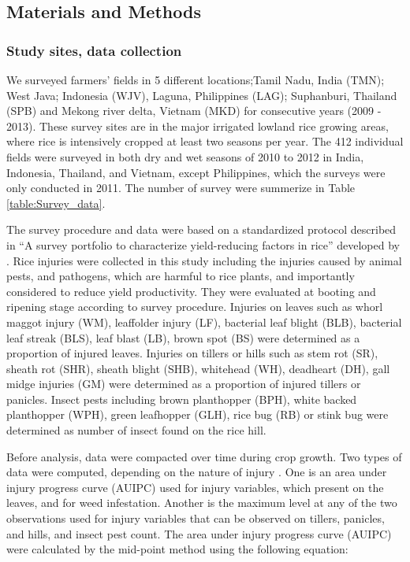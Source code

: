 \subsection{Materials and Methods}

\subsubsection{Study sites, data collection}

We surveyed farmers' fields in 5 different locations;Tamil Nadu, India (TMN); West Java; Indonesia (WJV), Laguna, Philippines (LAG); Suphanburi, Thailand (SPB) and Mekong river delta, Vietnam (MKD) for consecutive years (2009 - 2013). These survey sites are in the major irrigated lowland rice growing areas, where rice is intensively cropped at least two seasons per year. The 412 individual fields were surveyed in both dry and wet seasons of 2010 to 2012 in India, Indonesia, Thailand, and Vietnam, except Philippines, which the surveys were only conducted in 2011. The number of survey were summerize in Table 
\ref{table:Survey_data}.

The survey procedure and data were based on a standardized protocol described in ``A survey portfolio to characterize yield-reducing factors in rice'' developed by \citet{Savary_2009_Survey}. Rice injuries were collected in this study including the injuries caused by animal pests, and pathogens, which are harmful to rice plants, and importantly considered to reduce yield productivity. They were evaluated at booting and ripening stage according to survey procedure. Injuries on leaves such as whorl maggot injury (WM), leaffolder injury (LF), bacterial leaf blight (BLB), bacterial leaf streak (BLS), leaf blast (LB), brown spot (BS) were determined as a proportion of injured leaves. Injuries on tillers or hills such as stem rot (SR), sheath rot (SHR), sheath blight (SHB), whitehead (WH), deadheart (DH), gall midge injuries (GM) were determined as a proportion of injured tillers or panicles. Insect pests including brown planthopper (BPH), white backed planthopper (WPH), green leafhopper (GLH), rice bug (RB) or stink bug were determined as number of insect found on the rice hill. 

Before analysis, data were compacted over time during crop growth. Two types of data were computed, depending on the nature of injury \citet{Savary_2009_Survey}. One is an area under injury progress curve (AUIPC) used for injury variables, which present on the leaves, and for weed infestation. Another is the maximum level at any of the two observations used for injury variables that can be observed on tillers, panicles, and hills, and insect pest count. The area under injury progress curve (AUIPC) \citep{Campbell_1990_Introduction} were calculated by the mid-point method using the following equation: 


